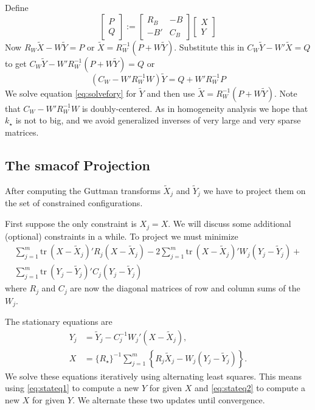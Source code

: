 \documentclass[
  12pt,
]{article}
\begin{document}
Define
\begin{equation}
\begin{bmatrix}
P\\Q
\end{bmatrix}:=
\begin{bmatrix}
R_B&-B\\
-B'&C_B
\end{bmatrix}
\begin{bmatrix}X\\Y\end{bmatrix}
\label{eq:gusolve}
\end{equation}
Now
\(R_W\tilde X-W\tilde Y=P\) or \(\tilde X=R_W^{-1}(P+W\tilde Y)\). Substitute this in \(C_W\tilde Y-W'\tilde X=Q\)
to get \(C_W\tilde Y-W'R_W^{-1}(P+W\tilde Y)=Q\) or
\begin{equation}
(C_W-W'R_W^{-1}W)\tilde Y=Q+W'R_W^{-1}P
\label{eq:solvefory}
\end{equation}
We solve equation \eqref{eq:solvefory} for \(\tilde Y\) and then use \(\tilde X=R_W^{-1}(P+W\tilde Y)\).
Note that \(C_W-W'R_W^{-1}W\) is doubly-centered.
As in homogeneity analysis we hope that \(k_\star\)
is not to big, and we avoid generalized inverses of very large and very
sparse matrices.

\subsection{The smacof Projection}\label{the-smacof-projection}

After computing the Guttman transforms \(\tilde X_j\) and \(\tilde Y_j\) we have to project them on the set of constrained configurations.

First suppose the only constraint is \(X_j=X\). We will discuss some additional (optional) constraints in a while. To project we must minimize
\begin{multline}
\sum_{j=1}^m\text{tr}\ (X-\tilde X_j)'R_j(X-\tilde X_j)-2\sum_{j=1}^m\text{tr}\ (X-\tilde X_j)'W_j(Y_j-\tilde Y_j)+\\
\sum_{j=1}^m\text{tr}\ (Y_j-\tilde Y_j)'C_j(Y_j-\tilde Y_j)
\end{multline}
where \(R_j\) and \(C_j\) are now the diagonal matrices of row and column sums of the \(W_j\).

The stationary equations are
\begin{align}
Y_j&=\tilde Y_j-C_j^{-1}W_j'(X-\tilde X_j),\label{eq:stateq1}\\
X&=\{R_\star\}^{-1}\sum_{j=1}^m\left\{R_j\tilde X_j-W_j(Y_j-\tilde Y_j)\right\}.\label{eq:stateq2}
\end{align}
We solve these equations iteratively using alternating least squares.
This means using \eqref{eq:stateq1} to compute a new \(Y\) for given \(X\) and \eqref{eq:stateq2} to compute a new \(X\) for given \(Y\). We alternate these two updates until convergence.
\end{document}
